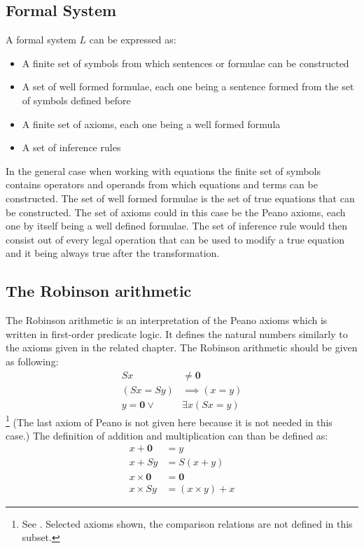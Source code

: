 \documentclass[english,12pt]{article}
\begin{document}
\subsection{Formal System}
A formal system $L$ can be expressed as:
\begin{itemize}
\item A finite set of symbols from which sentences or formulae can be constructed
\item A set of well formed formulae, each one being a sentence formed from the set of symbols defined before
\item A finite set of axioms, each one being a well formed formula
\item A set of inference rules
\end{itemize}
In the general case when working with equations the finite set of symbols contains operators and operands from which equations and terms can be constructed. The set of well formed formulae is the set of true equations that can be constructed. The set of axioms could in this case be the Peano axioms, each one by itself being a well defined formulae. The set of inference rule would then consist out of every legal operation that can be used to modify a true equation and it being always true after the transformation.

\subsection{The Robinson arithmetic}
The Robinson arithmetic is an interpretation of the Peano axioms which is written in first-order predicate logic. It defines the natural numbers similarly to the axioms given in the related chapter. The Robinson arithmetic should be given as following:
\begin{align}
    Sx &\neq \mathbf {0}\\
    (Sx = Sy) &\implies (x = y)\\
    \displaystyle y=\mathbf {0} \vee & \exists x(Sx=y)
\end{align}\footnote{See \cite{CMyFiles21:online}. Selected axioms shown, the comparison relations are not defined in this subset.}
(The last axiom of Peano is not given here because it is not needed in this case.)
The definition of addition and multiplication can than be defined as:
\begin{align}
    x + \mathbf {0} &= y \\
    x + Sy &= S(x+y) \\
    x \times \mathbf {0} &= \mathbf {0} \\
    x \times Sy &= (x \times y) + x
\end{align}
\end{document}
